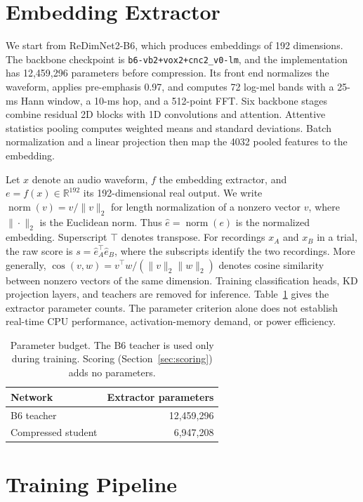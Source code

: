 \documentclass[11pt]{article}
\newcommand{\ltn}{\operatorname{norm}}
\begin{document}
\section{Embedding Extractor}
\label{sec:model}
We start from ReDimNet2-B6, which produces embeddings of 192 dimensions. The backbone checkpoint is \nolinkurl{b6-vb2+vox2+cnc2_v0-lm}, and the implementation has 12,459,296 parameters before compression. Its front end normalizes the waveform, applies pre-emphasis 0.97, and computes 72 log-mel bands with a 25-ms Hann window, a 10-ms hop, and a 512-point FFT. Six backbone stages combine residual 2D blocks with 1D convolutions and attention. Attentive statistics pooling computes weighted means and standard deviations. Batch normalization and a linear projection then map the 4032 pooled features to the embedding.

Let $x$ denote an audio waveform, $f$ the embedding extractor, and $e=f(x)\in\mathbb R^{192}$ its 192-dimensional real output. We write $\ltn(v)=v/\|v\|_2$ for length normalization of a nonzero vector $v$, where $\|\cdot\|_2$ is the Euclidean norm. Thus $\hat e=\ltn(e)$ is the normalized embedding. Superscript $\top$ denotes transpose. For recordings $x_A$ and $x_B$ in a trial, the raw score is $s=\hat e_A^\top\hat e_B$, where the subscripts identify the two recordings. More generally, $\cos(v,w)=v^\top w/(\|v\|_2\|w\|_2)$ denotes cosine similarity between nonzero vectors of the same dimension. Training classification heads, KD projection layers, and teachers are removed for inference. Table~\ref{tab:params} gives the extractor parameter counts. The parameter criterion alone does not establish real-time CPU performance, activation-memory demand, or power efficiency.

\begin{table}[t]
\centering
\begin{tabular}{lr}
\toprule
Network & Extractor parameters \\
\midrule
B6 teacher & 12,459,296 \\
Compressed student & 6,947,208 \\
\bottomrule
\end{tabular}
\caption{Parameter budget. The B6 teacher is used only during training. Scoring (Section~\ref{sec:scoring}) adds no parameters.}
\label{tab:params}
\end{table}

\section{Training Pipeline}
\label{sec:training}
\end{document}
